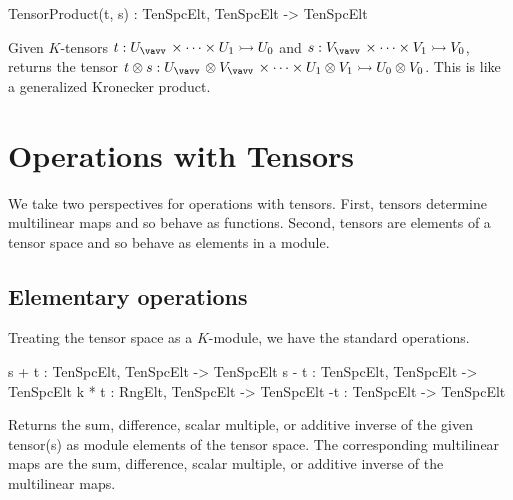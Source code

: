 \begin{intrinsics}
TensorProduct(t, s) : TenSpcElt, TenSpcElt -> TenSpcElt
\end{intrinsics}

Given $K$-tensors $t:U_{\vav}\times \cdots \times U_1\rightarrowtail U_0$ and $s:V_{\vav}\times \cdots \times V_1\rightarrowtail V_0$, returns the tensor $t\otimes s : U_{\vav}\otimes V_{\vav}\times \cdots \times U_1\otimes V_1\rightarrowtail U_0\otimes V_0$. 
This is like a generalized Kronecker product. 


\section{Operations with Tensors}

We take two perspectives for operations with tensors. 
First, tensors determine multilinear maps and so behave as
functions.  Second, tensors are elements of a tensor space and 
so behave as elements in a module.  

\subsection{Elementary operations}
Treating the tensor space as a $K$-module, we have the standard operations.

\index{$+$}
\begin{intrinsics}
s + t : TenSpcElt, TenSpcElt -> TenSpcElt
s - t : TenSpcElt, TenSpcElt -> TenSpcElt
k * t : RngElt, TenSpcElt -> TenSpcElt
-t : TenSpcElt -> TenSpcElt
\end{intrinsics}

Returns the sum, difference, scalar multiple, or additive inverse of the given tensor(s) as module elements of the tensor space. 
The corresponding multilinear maps are the sum, difference, scalar multiple, or additive inverse of the multilinear maps.

